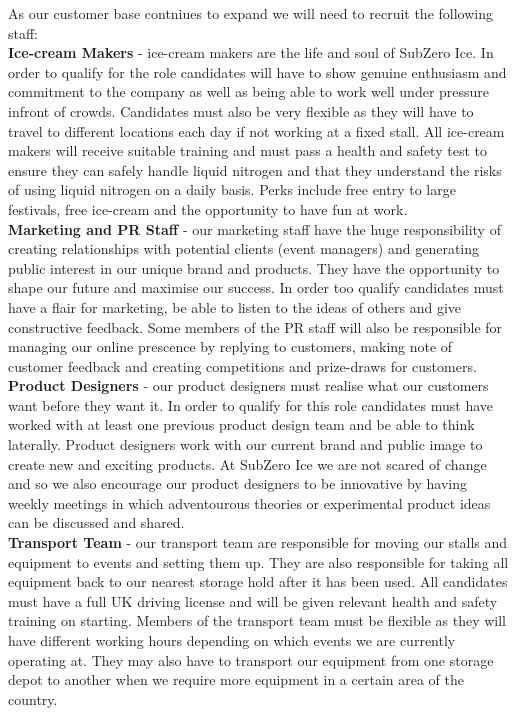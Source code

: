 \documentclass{article}
\begin{document}
  As our customer base contniues to expand we will need to recruit the following staff: \\

{\bf Ice-cream Makers} - ice-cream makers are the life and soul of SubZero Ice. In order to qualify for the role candidates will have to show genuine enthusiasm and commitment to the company as well as being able to work well under pressure infront of crowds. Candidates must also be very flexible as they will have to travel to different locations each day if not working at a fixed stall. All ice-cream makers will receive suitable training and must pass a health and safety test to ensure they can safely handle liquid nitrogen and that they understand the risks of using liquid nitrogen on a daily basis. Perks include free entry to large festivals, free ice-cream and the opportunity to have fun at work. \\

{\bf Marketing and PR Staff} - our marketing staff have the huge responsibility of creating relationships with potential clients (event managers) and generating public interest in our unique brand and products. They have the opportunity to shape our future and maximise our success. In order too qualify candidates must have a flair for marketing, be able to listen to the ideas of others and give constructive feedback. Some members of the PR staff will also be responsible for managing our online prescence by replying to customers, making note of customer feedback and creating competitions and prize-draws for customers. \\

{\bf Product Designers} - our product designers must realise what our customers want before they want it. In order to qualify for this role candidates must have worked with at least one previous product design team and be able to think laterally. Product designers work with our current brand and public image to create new and exciting products. At SubZero Ice we are not scared of change and so we also encourage our product designers to be innovative by having weekly meetings in which adventourous theories or experimental product ideas can be discussed and shared. \\

{\bf Transport Team} - our transport team are responsible for moving our stalls and equipment to events and setting them up. They are also responsible for taking all equipment back to our nearest storage hold after it has been used. All candidates must have a full UK driving license and will be given relevant health and safety training on starting. Members of the transport team must be flexible as they will have different working hours depending on which events we are currently operating at. They may also have to transport our equipment from one storage depot to another when we require more equipment in a certain area of the country. \\
\end{document}
